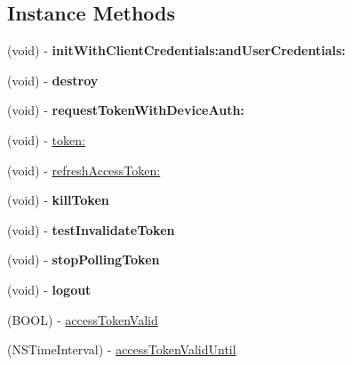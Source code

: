 \subsection*{Instance Methods}
\begin{DoxyCompactItemize}
\item 
(void) -\/ {\bfseries init\+With\+Client\+Credentials\+:and\+User\+Credentials\+:}\hypertarget{interface_s_c_account_manager_af14f562bcdb49aab4005cd7257ea521e}{}\label{interface_s_c_account_manager_af14f562bcdb49aab4005cd7257ea521e}

\item 
(void) -\/ {\bfseries destroy}\hypertarget{interface_s_c_account_manager_a375e07068334bb191586c8581113c7a6}{}\label{interface_s_c_account_manager_a375e07068334bb191586c8581113c7a6}

\item 
(void) -\/ {\bfseries request\+Token\+With\+Device\+Auth\+:}\hypertarget{interface_s_c_account_manager_ab0d46412d9bceabc7aa9d6607d294f3a}{}\label{interface_s_c_account_manager_ab0d46412d9bceabc7aa9d6607d294f3a}

\item 
(void) -\/ \hyperlink{interface_s_c_account_manager_aadf9a65dda930b011861b333b66646bb}{token\+:}
\item 
(void) -\/ \hyperlink{interface_s_c_account_manager_a4b9d44be000569b312c7e96f1df32d41}{refresh\+Access\+Token\+:}
\item 
(void) -\/ {\bfseries kill\+Token}\hypertarget{interface_s_c_account_manager_a106237494a81fab3b37f37e2fa858133}{}\label{interface_s_c_account_manager_a106237494a81fab3b37f37e2fa858133}

\item 
(void) -\/ {\bfseries test\+Invalidate\+Token}\hypertarget{interface_s_c_account_manager_a8d8bc8406555a0da080582c1932447c4}{}\label{interface_s_c_account_manager_a8d8bc8406555a0da080582c1932447c4}

\item 
(void) -\/ {\bfseries stop\+Polling\+Token}\hypertarget{interface_s_c_account_manager_a16696c42c3457976023b1c5a033669f1}{}\label{interface_s_c_account_manager_a16696c42c3457976023b1c5a033669f1}

\item 
(void) -\/ {\bfseries logout}\hypertarget{interface_s_c_account_manager_a4ae46dd973cbd73055688bbca9df7552}{}\label{interface_s_c_account_manager_a4ae46dd973cbd73055688bbca9df7552}

\item 
(B\+O\+OL) -\/ \hyperlink{interface_s_c_account_manager_a10dabf89ed4f6d576721c75fc7963af0}{access\+Token\+Valid}
\item 
(N\+S\+Time\+Interval) -\/ \hyperlink{interface_s_c_account_manager_a4b98c88dc7f7b5504aec11871634fe7c}{access\+Token\+Valid\+Until}
\end{DoxyCompactItemize}
